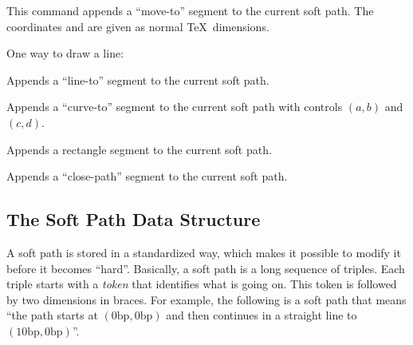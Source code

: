 \begin{command}{\pgfsyssoftpath@moveto{}}
    This command appends a ``move-to'' segment to the current soft path. The
    coordinates  and  are given as normal \TeX\ dimensions.

    \example One way to draw a line:
\begin{codeexample}
\pgfsyssoftpath@moveto{0pt}{0pt}
\pgfsyssoftpath@lineto{10pt}{10pt}
\pgfsyssoftpath@flushcurrentpath
\pgfsys@stroke
\end{codeexample}
\end{command}

\begin{command}{\pgfsyssoftpath@lineto{}}
    Appends a ``line-to'' segment to the current soft path.
\end{command}

\begin{command}{\pgfsyssoftpath@curveto{}}
    Appends a ``curve-to'' segment to the current soft path with controls
    $(a,b)$ and $(c,d)$.
\end{command}

\begin{command}{\pgfsyssoftpath@rect{}}
    Appends a rectangle segment to the current soft path.
\end{command}

\begin{command}{\pgfsyssoftpath@closepath}
    Appends a ``close-path'' segment to the current soft path.
\end{command}


\subsection{The Soft Path Data Structure}

A soft path is stored in a standardized way, which makes it possible to modify
it before it becomes ``hard''. Basically, a soft path is a long sequence of
triples. Each triple starts with a \emph{token} that identifies what is going
on. This token is followed by two dimensions in braces. For example, the
following is a soft path that means ``the path starts at $(0\mathrm{bp},
0\mathrm{bp})$ and then continues in a straight line to $(10\mathrm{bp},
0\mathrm{bp})$''.
%
\begin{codeexample}
\pgfsyssoftpath@movetotoken{0bp}{0bp}\pgfsyssoftpath@linetotoken{10bp}{0bp}
\end{codeexample}

